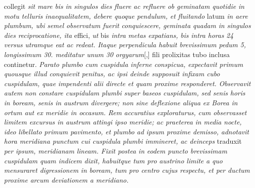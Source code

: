 collegit
\textit{sit mare bis in singulos dies fluere ac refluere\protect{}
ob geminatam quotidie in motu telluris\protect{} inaequalitatem,
debere quoque pendulum,\protect{}
et fluitando}
latum
\textit{in aere plumbum,
ubi semel observatum fuerit conquiescere,
geminata quadam in singulos dies reciprocatione, ita}
effici,
\textit{ut} bis
\textit{intra metas expatians,
bis intra horas 24 versus utramque eat ac redeat.
Itaque perpendicula\protect{}
habuit brevissimum pedum 5,
longissimum 30.
meditatur unum 30 orgyarum}[,]
fili prolixitas tubo inclusa continetur.
\textit{Parato plumbo cum cuspidula inferne conspicua,
expectavit primum quousque illud conquievit penitus,
ac ipsi deinde supposuit infixam cubo cuspidulam,
quae impendenti alii directe et quam proxime responderet.
Observavit autem non constare cuspidulam plumbi super baseos cuspidulam,
sed senis horis in boream,\protect{}
senis in austrum\protect{} divergere;
non sine deflexione aliqua ex Borea\protect{}
in ortum aut ex meridie in occasum.
Rem accuratius exploraturus,
cum observasset limitem excursus
in austrum\protect{}
attingi ipso meridie;
ac praeterea in media nocte,
ideo libellato primum pavimento,
et plumbo ad ipsum proxime demisso,
adnotavit hora meridiana punctum
cui cuspidula plumbi immineret,
ac deinceps}
traduxit
\textit{per ipsum, meridianam lineam.
Fixit postea in eodem puncto brevissimam cuspidulam
quam indicem dixit,
habuitque tum pro austrino\protect{}
limite a quo mensuraret digressionem in boream,\protect{}
tum pro centro cujus respectu,
et per ductum proxime arcum
deviationem a meridiano.}

